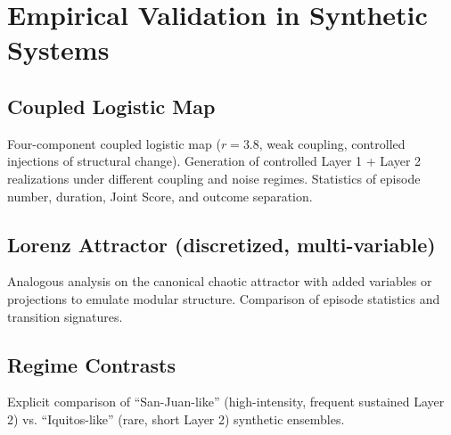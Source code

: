 \section{Empirical Validation in Synthetic Systems}

\subsection{Coupled Logistic Map}

Four-component coupled logistic map ($r=3.8$, weak coupling, controlled injections of structural change). Generation of controlled Layer 1 + Layer 2 realizations under different coupling and noise regimes. Statistics of episode number, duration, Joint Score, and outcome separation.

\subsection{Lorenz Attractor (discretized, multi-variable)}

Analogous analysis on the canonical chaotic attractor with added variables or projections to emulate modular structure. Comparison of episode statistics and transition signatures.

\subsection{Regime Contrasts}

Explicit comparison of “San-Juan-like” (high-intensity, frequent sustained Layer 2) vs. “Iquitos-like” (rare, short Layer 2) synthetic ensembles.
